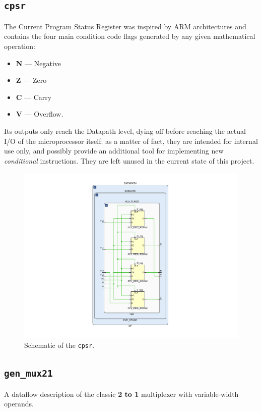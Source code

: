 \subsection{\texttt{cpsr}}
The Current Program Status Register was inspired by ARM architectures and contains the four main condition code flags generated by any given mathematical operation:
\label{cpsr}
\begin{itemize}
    \item \textbf{N} — Negative
    \item \textbf{Z} — Zero
    \item \textbf{C} — Carry
    \item \textbf{V} — Overflow.
\end{itemize}

Its outputs only reach the Datapath level, dying off before reaching the actual I/O of the microprocessor itself: as a matter of fact, they are intended for internal use only, and possibly provide an additional tool for implementing new \emph{conditional} instructions. They are left unused in the current state of this project.

\begin{figure}[!ht]
\centering
\includegraphics[width=\textwidth]{./chapters/figures/cpsr.pdf} 
\caption{Schematic of the \texttt{cpsr}.}
\end{figure}

\subsection{\texttt{gen\_mux21}}
\label{2to1}
A dataflow description of the classic \textbf{2 to 1} multiplexer with variable-width operands.

